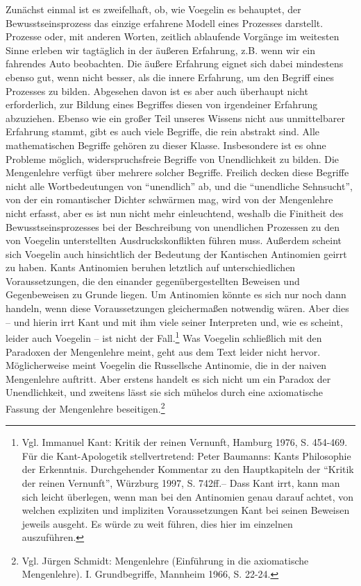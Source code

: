Zunächst einmal ist es zweifelhaft, ob, wie Voegelin es behauptet, der
Bewusstseinsprozess das einzige erfahrene Modell eines Prozesses darstellt.
Prozesse oder, mit anderen Worten, zeitlich ablaufende Vorgänge im weitesten
Sinne erleben wir tagtäglich in der äußeren Erfahrung, z.B. wenn wir ein
fahrendes Auto beobachten. Die äußere Erfahrung eignet sich dabei mindestens
ebenso gut, wenn nicht besser, als die innere Erfahrung, um den Begriff eines
Prozesses zu bilden.  Abgesehen davon ist es aber auch überhaupt nicht
erforderlich, zur Bildung eines Begriffes diesen von irgendeiner Erfahrung
abzuziehen.  Ebenso wie ein großer Teil unseres Wissens nicht aus
unmittelbarer Erfahrung stammt, gibt es auch viele Begriffe, die rein abstrakt
sind.  Alle mathematischen Begriffe gehören zu dieser Klasse. Insbesondere ist
es ohne Probleme möglich, widerspruchsfreie Begriffe von Unendlichkeit zu
bilden. Die Mengenlehre verfügt über mehrere solcher Begriffe.  Freilich
decken diese Begriffe nicht alle Wortbedeutungen von "`unendlich"' ab, und die
"`unendliche Sehnsucht"', von der ein romantischer Dichter schwärmen mag, wird
von der Mengenlehre nicht erfasst, aber es ist nun nicht mehr einleuchtend,
weshalb die Finitheit des Bewusstseinsprozesses bei der Beschreibung von
unendlichen Prozessen zu den von Voegelin unterstellten
Ausdruckskonflikten führen muss. Außerdem scheint sich Voegelin auch
hinsichtlich der Bedeutung der Kantischen Antinomien geirrt zu haben.  Kants
Antinomien beruhen letztlich auf unterschiedlichen Voraussetzungen, die den
einander gegenübergestellten Beweisen und Gegenbeweisen zu Grunde liegen.  Um
Antinomien könnte es sich nur noch dann handeln, wenn diese Voraussetzungen
gleichermaßen notwendig wären.  Aber dies -- und hierin irrt Kant und mit ihm
viele seiner Interpreten und, wie es scheint, leider auch Voegelin -- ist nicht
der Fall.\footnote{Vgl. Immanuel Kant: Kritik der reinen Vernunft, Hamburg
  1976, S. 454-469. Für die Kant-Apologetik stellvertretend: Peter Baumanns:
  Kants Philosophie der Erkenntnis. Durchgehender Kommentar zu den
  Hauptkapiteln der "`Kritik der reinen Vernunft"', Würzburg 1997, S. 742ff.--
  Dass Kant irrt, kann man sich leicht überlegen, wenn man bei den Antinomien
  genau darauf achtet, von welchen expliziten und impliziten Voraussetzungen
  Kant bei seinen Beweisen jeweils ausgeht.  Es würde zu weit führen, dies
  hier im einzelnen auszuführen.}  Was Voegelin schließlich mit den Paradoxen
der Mengenlehre meint, geht aus dem Text leider nicht hervor.  Möglicherweise
meint Voegelin die Russellsche Antinomie, die in der naiven Mengenlehre
auftritt.  Aber erstens handelt es sich nicht um ein Paradox der
Unendlichkeit, und zweitens lässt sie sich mühelos durch eine axiomatische
Fassung der Mengenlehre beseitigen.\footnote{Vgl. Jürgen Schmidt: Mengenlehre
  (Einführung in die axiomatische Mengenlehre). I.  Grundbegriffe, Mannheim
  1966, S. 22-24.}

